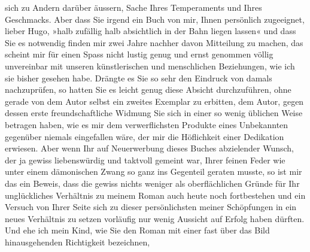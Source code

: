                sich zu Andern darüber äussern, Sache Ihres Temperaments und Ihres Geschmacks. Aber
               dass Sie irgend ein Buch von mir, Ihnen persönlich zugeeignet, lieber Hugo, »halb
               zufällig halb absichtlich in der Bahn liegen lassen« und dass Sie es notwendig finden
               mir zwei Jahre nachher  davon Mitteilung zu
               machen, das scheint mir für einen Spass nicht lustig genug und ernst genommen völlig
               unvereinbar mit unseren künstlerischen und menschlichen Beziehungen, wie ich sie
               bisher gesehen habe. Drängte es Sie so sehr den Eindruck von damals nachzuprüfen, so
               hatten Sie es leicht genug diese Absicht durchzuführen, ohne gerade von dem Autor
               selbst ein zweites Exemplar zu erbitten, dem Autor, gegen dessen erste
               freundschaftliche Widmung Sie sich in einer so wenig üblichen Weise betragen haben,
               wie es mir dem verwerflichsten Produkte eines Unbekannten gegenüber niemals einge{\pb}fallen wäre, der mir die Höflichkeit einer Dedikation
               erwiesen. Aber wenn Ihr auf Neuerwerbung dieses Buches abzielender Wunsch, der ja gewiss liebenswürdig und
               taktvoll gemeint war, Ihrer feinen Feder wie unter einem dämonischen Zwang so ganz
               ins Gegenteil geraten musste, so ist mir das ein Beweis, dass die gewiss nichts
               weniger als oberflächlichen Gründe für Ihr unglückliches Verhältnis zu meinem Roman auch heute noch
               fortbestehen und ein Versuch von Ihrer Seite sich zu dieser persönlichsten meiner
               Schöpfungen in ein neues Verhältnis zu setzen vorläufig nur wenig Aussicht auf Erfolg
               haben dürften. Und ehe ich mein Kind, wie Sie den Roman mit einer fast über das Bild hinausgehenden Richtigkeit bezeichnen,
